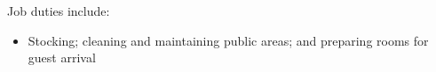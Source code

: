 \documentclass{resume}
\begin{document}
    \normalsize
    Job duties include:
    \small\begin{itemize}
    
        \item Stocking; cleaning and maintaining public areas; and preparing rooms for guest arrival
    
    \end{itemize}\normalsize
\end{document}
